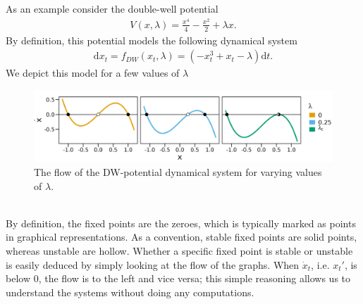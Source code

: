 As an example consider the double-well potential
\begin{align}
    V(x,\lambda) = \frac{x^4}{4} - \frac{x^2}{2} + \lambda x\label{eq:doubleWellPotential}.
\end{align}
By definition, this potential models the following dynamical system
\begin{align}
    \mathrm{d}x_t = f_{DW}(x_t, \lambda) = \left(-x_t^3 + x_t - \lambda \right) \mathrm{d}t \label{eq:originalDW}.
\end{align}
We depict this model for a few values of $\lambda$
\begin{figure}[h]
    \begin{center}
        \includegraphics[scale = .14]{figures/double_well_plot.jpeg}
        \caption{The flow of the DW-potential dynamical system for varying values of $\lambda$.}
        \label{figure:DW_dynamic_plot}
    \end{center}
\end{figure}\\
By definition, the fixed points are the zeroes, which is typically marked as points in graphical representations. As a convention, stable fixed points are solid points, whereas unstable are hollow. Whether a specific fixed point is stable or unstable is easily deduced by simply looking at the flow of the graphs. When $\dot{x}_t$, i.e. $x_t'$, is below 0, the flow is to the left and vice versa; this simple reasoning allows us to understand the systems without doing any computations.

